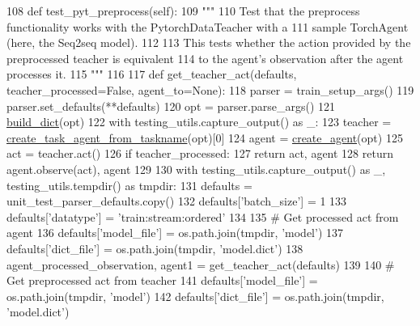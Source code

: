 \begin{DoxyCode}
108     \textcolor{keyword}{def }test\_pyt\_preprocess(self):
109         \textcolor{stringliteral}{"""}
110 \textcolor{stringliteral}{        Test that the preprocess functionality works with the PytorchDataTeacher with a}
111 \textcolor{stringliteral}{        sample TorchAgent (here, the Seq2seq model).}
112 \textcolor{stringliteral}{}
113 \textcolor{stringliteral}{        This tests whether the action provided by the preprocessed teacher is equivalent}
114 \textcolor{stringliteral}{        to the agent's observation after the agent processes it.}
115 \textcolor{stringliteral}{        """}
116 
117         \textcolor{keyword}{def }get\_teacher\_act(defaults, teacher\_processed=False, agent\_to=None):
118             parser = train\_setup\_args()
119             parser.set\_defaults(**defaults)
120             opt = parser.parse\_args()
121             \hyperlink{namespacebuild__dict}{build\_dict}(opt)
122             with testing\_utils.capture\_output() \textcolor{keyword}{as} \_:
123                 teacher = \hyperlink{namespaceparlai_1_1core_1_1agents_a76269fb567532a8fb7f29edcc20a6e47}{create\_task\_agent\_from\_taskname}(opt)[0]
124             agent = \hyperlink{namespaceparlai_1_1core_1_1agents_a00d77a7e26fb89e8bd900f7b2a02982a}{create\_agent}(opt)
125             act = teacher.act()
126             \textcolor{keywordflow}{if} teacher\_processed:
127                 \textcolor{keywordflow}{return} act, agent
128             \textcolor{keywordflow}{return} agent.observe(act), agent
129 
130         with testing\_utils.capture\_output() \textcolor{keyword}{as} \_, testing\_utils.tempdir() \textcolor{keyword}{as} tmpdir:
131             defaults = unit\_test\_parser\_defaults.copy()
132             defaults[\textcolor{stringliteral}{'batch\_size'}] = 1
133             defaults[\textcolor{stringliteral}{'datatype'}] = \textcolor{stringliteral}{'train:stream:ordered'}
134 
135             \textcolor{comment}{# Get processed act from agent}
136             defaults[\textcolor{stringliteral}{'model\_file'}] = os.path.join(tmpdir, \textcolor{stringliteral}{'model'})
137             defaults[\textcolor{stringliteral}{'dict\_file'}] = os.path.join(tmpdir, \textcolor{stringliteral}{'model.dict'})
138             agent\_processed\_observation, agent1 = get\_teacher\_act(defaults)
139 
140             \textcolor{comment}{# Get preprocessed act from teacher}
141             defaults[\textcolor{stringliteral}{'model\_file'}] = os.path.join(tmpdir, \textcolor{stringliteral}{'model'})
142             defaults[\textcolor{stringliteral}{'dict\_file'}] = os.path.join(tmpdir, \textcolor{stringliteral}{'model.dict'})

\end{DoxyCode}
